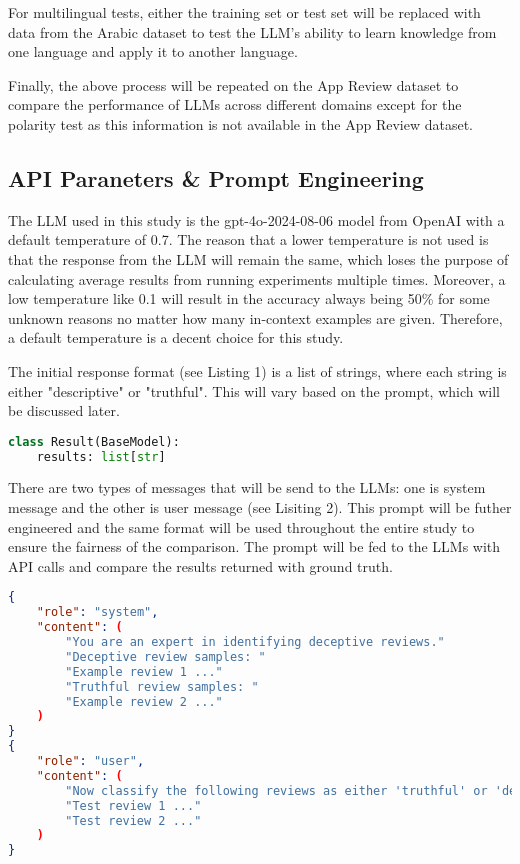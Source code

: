 \documentclass[sigconf, nonacm]{acmart}
\theoremstyle{definition}
\begin{document}
For multilingual tests, either the training set or test set will be replaced with data from the Arabic dataset to test the LLM's ability to learn knowledge from one language and apply it to another language.

Finally, the above process will be repeated on the App Review dataset to compare the performance of LLMs across different domains except for the polarity test as this information is not available in the App Review dataset.

\subsection{API Paraneters \& Prompt Engineering}

The LLM used in this study is the gpt-4o-2024-08-06 model from OpenAI with a default temperature of 0.7. The reason that a lower temperature is not used is that the response from the LLM will remain the same, which loses the purpose of calculating average results from running experiments multiple times. Moreover, a low temperature like 0.1 will result in the accuracy always being 50\%  for some unknown reasons no matter how many in-context examples are given. Therefore, a default temperature is a decent choice for this study.

The initial response format (see Listing 1) is a list of strings, where each string is either "descriptive" or "truthful". This will vary based on the prompt, which will be discussed later.

\begin{lstlisting}[language=Python, caption={Initial Response Format}]
class Result(BaseModel):
    results: list[str]
\end{lstlisting}

There are two types of messages that will be send to the LLMs: one is system message and the other is user message (see Lisiting 2). This prompt will be futher engineered and the same format will be used throughout the entire study to ensure the fairness of the comparison. The prompt will be fed to the LLMs with API calls and compare the results returned with ground truth.

\begin{lstlisting}[language=json, caption={Initial Prompt Messages}]
{
    "role": "system",
    "content": (
        "You are an expert in identifying deceptive reviews."
        "Deceptive review samples: "
        "Example review 1 ..."
        "Truthful review samples: "
        "Example review 2 ..."
    )
}
{
    "role": "user",
    "content": (
        "Now classify the following reviews as either 'truthful' or 'deceptive': "
        "Test review 1 ..."
        "Test review 2 ..."
    )
}
\end{lstlisting}
\end{document}
